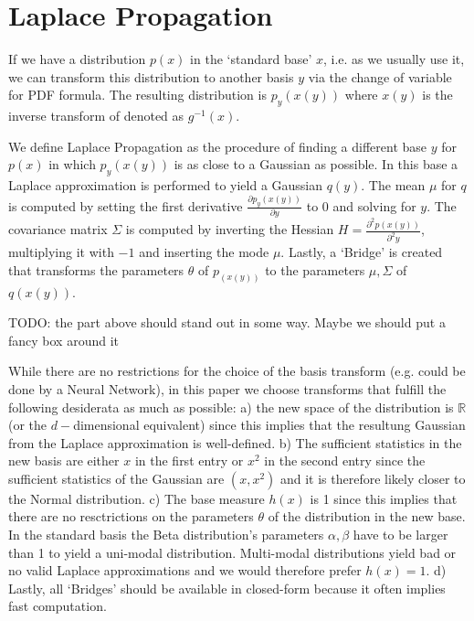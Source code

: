\section{Laplace Propagation}
\label{sec:GLB}


If we have a distribution $p(x)$ in the `standard base' $x$, i.e. as we usually use it, we can transform this distribution to another basis $y$ via the change of variable for PDF formula. The resulting distribution is $p_y(x(y))$ where $x(y)$ is the inverse transform of denoted as $g^{-1}(x)$. 

We define Laplace Propagation as the procedure of finding a different base $y$ for $p(x)$ in which $p_y(x(y))$ is as close to a Gaussian as possible. In this base a Laplace approximation is performed to yield a Gaussian $q(y)$. The mean $\mu$ for $q$ is computed by setting the first derivative $\frac{\partial p_y(x(y))}{\partial y}$ to 0 and solving for $y$. The covariance matrix $\Sigma$ is computed by inverting the Hessian $H = \frac{\partial^2 p(x(y))}{\partial^2 y}$, multiplying it with $-1$ and inserting the mode $\mu$. Lastly, a `Bridge' is created that transforms the parameters $\theta$ of $p_(x(y))$ to the parameters $\mu, \Sigma$ of $q(x(y))$.

TODO: the part above should stand out in some way. Maybe we should put a fancy box around it 

While there are no restrictions for the choice of the basis transform (e.g. could be done by a Neural Network), in this paper we choose transforms that fulfill the following desiderata as much as possible: a) the new space of the distribution is $\mathbb{R}$ (or the $d-$dimensional equivalent) since this implies that the resultung Gaussian from the Laplace approximation is well-defined. b) The sufficient statistics in the new basis are either $x$ in the first entry or $x^2$ in the second entry since the sufficient statistics of the Gaussian are $(x, x^2)$ and it is therefore likely closer to the Normal distribution. c) The base measure $h(x)$ is 1 since this implies that there are no resctrictions on the parameters $\theta$ of the distribution in the new base. In the standard basis the Beta distribution's parameters $\alpha,\beta$ have to be larger than 1 to yield a uni-modal distribution. Multi-modal distributions yield bad or no valid Laplace approximations and we would therefore prefer $h(x) = 1$. d) Lastly, all `Bridges' should be available in closed-form because it often implies fast computation. 

